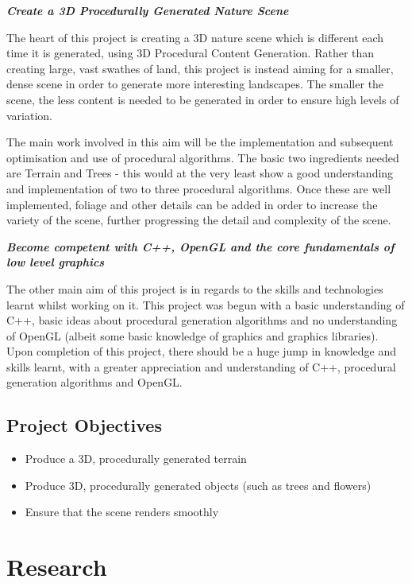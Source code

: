 \documentclass[a4paper,10pt]{report}
\begin{document}
\textbf{\textit{Create a 3D Procedurally Generated Nature Scene}} \medskip

The heart of this project is creating a 3D nature scene which is different each time it is generated, using 3D Procedural Content Generation. Rather than creating large, vast swathes of land, this project is instead aiming for a smaller, dense scene in order to generate more interesting landscapes. The smaller the scene, the less content is needed to be generated in order to ensure high levels of variation.\medskip

The main work involved in this aim will be the implementation and subsequent optimisation and use of procedural algorithms. The basic two ingredients needed are Terrain and Trees - this would at the very least show a good understanding and implementation of two to three procedural algorithms. Once these are well implemented, foliage and other details can be added in order to increase the variety of the scene, further progressing the detail and complexity of the scene.  \medskip


\textbf{\textit{Become competent with C++, OpenGL and the core fundamentals of low level graphics}} \medskip

The other main aim of this project is in regards to the skills and technologies learnt whilst working on it. This project was begun with a basic understanding of C++, basic ideas about procedural generation algorithms and no understanding of OpenGL (albeit some basic knowledge of graphics and graphics libraries). Upon completion of this project, there should be a huge jump in knowledge and skills learnt, with a greater appreciation and understanding of C++, procedural generation algorithms and OpenGL.\medskip

\section{Project Objectives}

\begin{itemize}
    \item Produce a 3D, procedurally generated terrain
    \item Produce 3D, procedurally generated objects (such as trees and flowers)
    \item Ensure that the scene renders smoothly
\end{itemize}

\chapter{Research}
\end{document}
